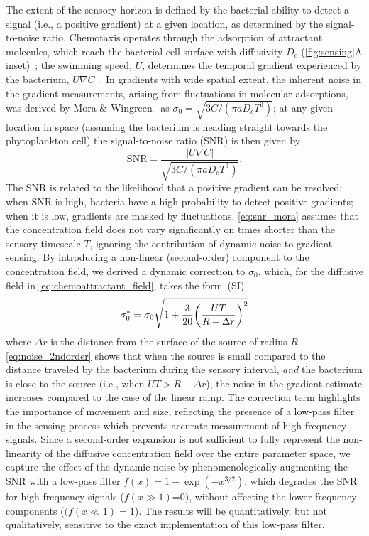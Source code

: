 \documentclass[9pt,twocolumn,twoside]{pnas-new}
\newcommand{\SNR}{\mathrm{SNR}}
\begin{document}
The extent of the sensory horizon is defined by the bacterial ability to detect a signal (i.e., a positive gradient) at a given location, as determined by the signal-to-noise ratio.
Chemotaxis operates through the adsorption of attractant molecules, which reach the bacterial cell surface with diffusivity $D_c$ (\autoref{fig:sensing}A inset)~\cite{berg1977physics}; the swimming speed, $U$, determines the temporal gradient experienced by the bacterium, $U\nabla C$~\cite{berg1977physics,hein2016physical}.
In gradients with wide spatial extent, the inherent noise in the gradient measurements, arising from fluctuations in molecular adsorptions, was derived by Mora \& Wingreen~\cite{mora2010limits} as $\sigma_0 = \sqrt{3C/(\pi a D_c T^3)}$; at any given location in space (assuming the bacterium is heading straight towards the phytoplankton cell) the signal-to-noise ratio ($\SNR$) is then given by
\begin{equation}\label{eq:snr_mora}
    \SNR = \dfrac{|U\nabla C|}{\sqrt{3C/(\pi a D_c T^3)}}.
\end{equation}
The $\SNR$ is related to the likelihood that a positive gradient can be resolved:
when $\SNR$ is high, bacteria have a high probability to detect positive gradients; when it is low, gradients are masked by fluctuations.
\autoref{eq:snr_mora} assumes that the concentration field does not vary significantly on times shorter than the sensory timescale $T$, ignoring the contribution of dynamic noise to gradient sensing. By introducing a non-linear (second-order) component to the concentration field, we derived a dynamic correction to $\sigma_0$, which, for the diffusive field in \autoref{eq:chemoattractant_field}, takes the form~(SI)
\begin{equation}\label{eq:noise_2ndorder}
  \sigma_0^* = \sigma_0\sqrt{1 + \dfrac{3}{20}\qty(\dfrac{UT}{R+\Delta r})^2}
\end{equation}
where $\Delta r$ is the distance from the surface of the source of radius $R$. \autoref{eq:noise_2ndorder} shows that when the source is small compared to the distance traveled by the bacterium during the sensory interval, \emph{and} the bacterium is close to the source (i.e., when $UT>R+\Delta r$), the noise in the gradient estimate increases compared to the case of the linear ramp. The correction term highlights the importance of movement and size, reflecting the presence of a low-pass filter in the sensing process which prevents accurate measurement of high-frequency signals.
Since a second-order expansion is not sufficient to fully represent the non-linearity of the diffusive concentration field over the entire parameter space, we capture the effect of the dynamic noise by phenomenologically augmenting the $\SNR$ with a low-pass filter $f(x)=1-\exp(-x^{3/2})$, which degrades the $\SNR$ for high-frequency signals ($f(x\gg1)$=0), without affecting the lower frequency components ($(f(x\ll1)=1$). The results will be quantitatively, but not qualitatively, sensitive to the exact implementation of this low-pass filter.
\end{document}
